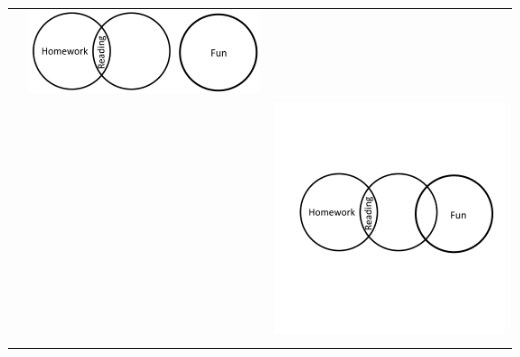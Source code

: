 \documentclass[12pt,a4paper]{report}
\begin{document}
\begin{table}[h!]
\begin{tabular}{  c  c  c }
\begin{minipage}{.22\textwidth}
    \end{minipage}
    & 
    \begin{minipage}{.22\textwidth}
      \includegraphics[width=\linewidth]{EulerSomeReadingIsNotFun1}
    \end{minipage}
    \\
    &
     &
    \begin{minipage}{.22\textwidth}
      \includegraphics[width=\textwidth]{EulerSomeReadingIsNotFun2}
    \end{minipage}
    \\
    &
     &
    \begin{minipage}{.22\textwidth}

\end{minipage}
\end{tabular}
\end{table}
\end{document}
